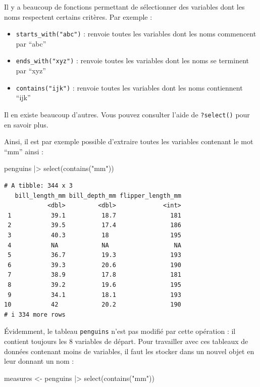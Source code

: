\documentclass[
  a4paper,
  DIV=11,
  numbers=noendperiod,
  oneside]{scrreprt}
\newenvironment{Shaded}{}{}
\newcommand{\FunctionTok}[1]{\textcolor[rgb]{0.44,0.26,0.76}{#1}}
\newcommand{\NormalTok}[1]{\textcolor[rgb]{0.14,0.16,0.18}{#1}}
\newcommand{\OtherTok}[1]{\textcolor[rgb]{0.44,0.26,0.76}{#1}}
\newcommand{\SpecialCharTok}[1]{\textcolor[rgb]{0.00,0.36,0.77}{#1}}
\newcommand{\StringTok}[1]{\textcolor[rgb]{0.01,0.18,0.38}{#1}}
\providecommand{\tightlist}{%
  \setlength{\itemsep}{0pt}\setlength{\parskip}{0pt}}\usepackage{longtable,booktabs,array}
\begin{document}
Il y a beaucoup de fonctions permettant de sélectionner des variables
dont les noms respectent certains critères. Par exemple :

\begin{itemize}
\tightlist
\item
  \texttt{starts\_with("abc")} : renvoie toutes les variables dont les
  noms commencent par ``abc''
\item
  \texttt{ends\_with("xyz")} : renvoie toutes les variables dont les
  noms se terminent par ``xyz''
\item
  \texttt{contains("ijk")} : renvoie toutes les variables dont les noms
  contiennent ``ijk''
\end{itemize}

Il en existe beaucoup d'autres. Vous pouvez consulter l'aide de
\texttt{?select()} pour en savoir plus.

Ainsi, il est par exemple possible d'extraire toutes les variables
contenant le mot ``mm'' ainsi :

\begin{Shaded}
\begin{Highlighting}[]
\NormalTok{penguins }\SpecialCharTok{|\textgreater{}}
  \FunctionTok{select}\NormalTok{(}\FunctionTok{contains}\NormalTok{(}\StringTok{"mm"}\NormalTok{))}
\end{Highlighting}
\end{Shaded}

\begin{verbatim}
# A tibble: 344 x 3
   bill_length_mm bill_depth_mm flipper_length_mm
            <dbl>         <dbl>             <int>
 1           39.1          18.7               181
 2           39.5          17.4               186
 3           40.3          18                 195
 4           NA            NA                  NA
 5           36.7          19.3               193
 6           39.3          20.6               190
 7           38.9          17.8               181
 8           39.2          19.6               195
 9           34.1          18.1               193
10           42            20.2               190
# i 334 more rows
\end{verbatim}

Évidemment, le tableau \texttt{penguins} n'est pas modifié par cette
opération : il contient toujours les 8 variables de départ. Pour
travailler avec ces tableaux de données contenant moins de variables, il
faut les stocker dans un nouvel objet en leur donnant un nom :

\begin{Shaded}
\begin{Highlighting}[]
\NormalTok{measures }\OtherTok{\textless{}{-}}\NormalTok{ penguins }\SpecialCharTok{|\textgreater{}}
  \FunctionTok{select}\NormalTok{(}\FunctionTok{contains}\NormalTok{(}\StringTok{"mm"}\NormalTok{))}
\end{Highlighting}
\end{Shaded}
\end{document}
